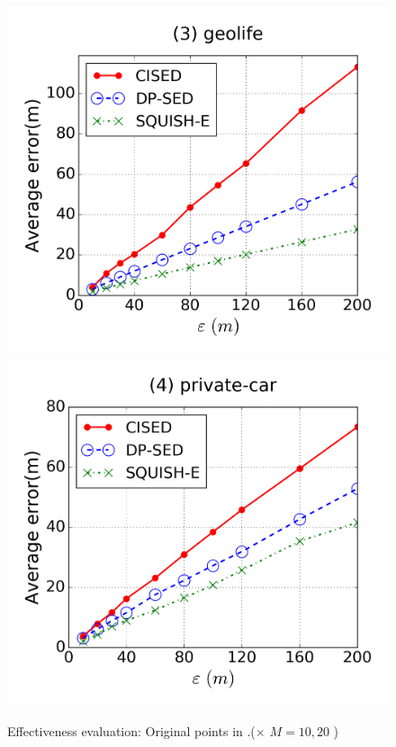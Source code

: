 {\begin{figure}[tb]
\includegraphics[scale = 0.250]{figures/Exp-error-epsilon-geolife.png}
\includegraphics[scale = 0.250]{figures/Exp-error-epsilon-private.png}
\vspace{-3ex}
\caption{\small Effectiveness evaluation: Original points in \cista.(\cista  $\times$ $M = 10, {20}$ )}
\label{fig:orig-points}
\vspace{-1ex}
\end{figure}
}


